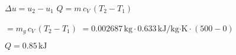 \( \Delta u = u_2 - u_1 \)  
\( Q = m \, c_V \, (T_2 - T_1) \)  

\( = m_g \, c_V \, (T_2 - T_1) \)  
\( = 0.002687 \, \text{kg} \cdot 0.633 \, \text{kJ/kg·K} \cdot (500 - 0) \)  

\( Q = 0.85 \, \text{kJ} \)